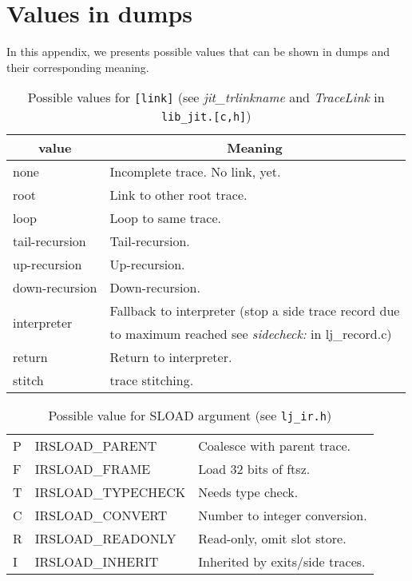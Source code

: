 
\chapter{Values in dumps}
\label{Apendix:dump-values}

In this appendix, we presents possible values that can be shown in dumps and their corresponding meaning.

\begin{table}[H]
\centering
\caption{
  Possible values for \texttt{[link]} (see \textit{jit\_trlinkname} and \textit{TraceLink} in \texttt{lib\_jit.[c,h]}) }
  
\label{tab:dump-link}
\begin{tabular}{|l|l|}
\hline
\multicolumn{1}{|c|}{value} & \multicolumn{1}{c|}{Meaning}\\\hline
none                        & Incomplete trace. No link, yet.\\
root                        & Link to other root trace.\\
loop                        & Loop to same trace.\\
tail-recursion              & Tail-recursion.\\
up-recursion                & Up-recursion.\\
down-recursion              & Down-recursion.\\\hline
\multirow{2}{*}{interpreter}& Fallback to interpreter (stop a side trace record due\\
& to maximum reached see \emph{sidecheck:} in lj\_record.c)\\\hline
return                      & Return to interpreter.\\
stitch                      & trace stitching.\\\hline
\end{tabular}
\end{table}

\begin{table}[H]
\centering
\caption{ Possible value for SLOAD argument (see \texttt{lj\_ir.h}) }
\label{tab:dump-sload}
\begin{tabular}{|l|l|l|}
\hline
P & IRSLOAD\_PARENT    & Coalesce with parent trace.\\
F & IRSLOAD\_FRAME     & Load 32 bits of ftsz.\\
T & IRSLOAD\_TYPECHECK & Needs type check.\\
C & IRSLOAD\_CONVERT   & Number to integer conversion.\\
R & IRSLOAD\_READONLY  & Read-only, omit slot store.\\
I & IRSLOAD\_INHERIT   & Inherited by exits/side traces.\\
\hline
\end{tabular}
\end{table}

